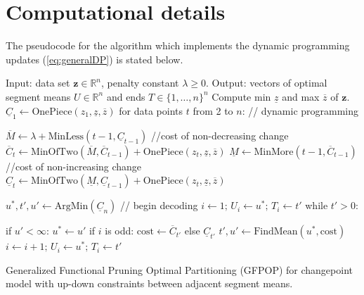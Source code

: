 \documentclass[article]{jss}
\newcommand{\RR}{\mathbb R}
\begin{document}

\section*{Computational details}

The pseudocode for the algorithm which implements the dynamic
programming updates (\ref{eq:generalDP}) is stated below.

\begin{algorithm}
\begin{algorithmic}[1]
\STATE Input: data set $\mathbf z\in\RR^n$, penalty constant $\lambda\geq 0$.
\STATE Output: vectors of optimal segment means $U\in\RR^{n}$ and ends $T\in\{1,\dots,n\}^{n}$
\STATE Compute min $\underline z$ and max $\overline z$ of $\mathbf z$.
\label{line:op-min-max}
\STATE
$\underline C_1\gets
 \text{OnePiece}(z_1, \underline z, \overline z)$
\STATE for data points $t$ from 2 to $n$: // dynamic programming
\label{line:for-dp-t}
\begin{ALC@g}
  \STATE $\overline M\gets \lambda + \text{MinLess}(t-1, \underline C_{t-1})$ //cost of non-decreasing change
  \label{line:op-MinLess}
  \STATE $\overline C_{t}\gets \text{MinOfTwo}(\overline M, \overline C_{t-1})+\text{OnePiece}(z_t, \underline z, \overline z)$
  \label{line:op-MinOfTwo}
  \STATE $\underline M\gets \text{MinMore}(t-1, \overline C_{t-1})$ //cost of non-increasing change
  \label{line:op-MinMore}
  \STATE $\underline C_{t}\gets \text{MinOfTwo}(\underline M, \underline C_{t-1})+\text{OnePiece}(z_t, \underline z, \overline z)$
  \label{line:op-MinOfTwo-under}
\end{ALC@g}
\STATE $u^*,t',u'\gets \text{ArgMin}(\underline C_{n})$ // begin decoding
\label{line:op-ArgMin}
\STATE $i\gets 1;\, U_{i}\gets u^*;\, T_{i}\gets t'$
\label{line:op-store-i}
\STATE while $t' > 0$:
\begin{ALC@g}
  \STATE if $u' < \infty$: $u^*\gets u'$
  \STATE if $i$ is odd: $\text{cost}\gets \overline C_{t'}$ else $\underline C_{t'}$
  \STATE $t',u'\gets\text{FindMean}(u^*, \text{cost})$
  \STATE $i\gets i+1;\, U_{i}\gets u^*;\, T_{i}\gets t'$
\label{line:op-i+1}
\end{ALC@g}
\caption{\label{algo:GFPOP}Generalized Functional Pruning Optimal
  Partitioning (GFPOP) for changepoint model with up-down constraints
  between adjacent segment means.}
\end{algorithmic}
\end{algorithm}
\end{document}
